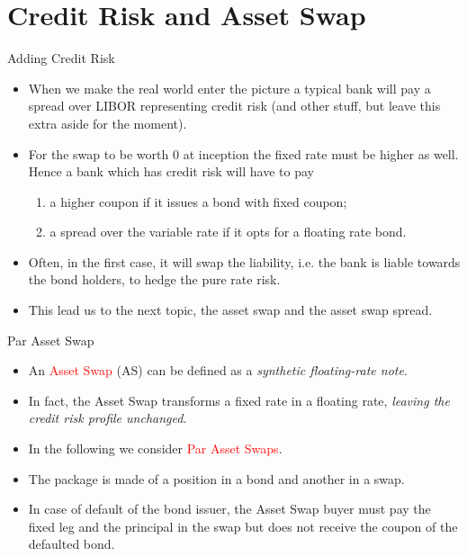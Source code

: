 \documentclass{beamer}
\begin{document}
\section{Credit Risk and Asset Swap}
\begin{frame}{Adding Credit Risk}
	\begin{itemize}
		\item When we make the real world enter the picture a typical bank will pay a spread over LIBOR representing credit risk (and other stuff, but leave this extra aside for the moment). 
		\item For the swap to be worth 0 at inception the fixed rate must be higher as well. Hence a bank which has credit risk will have to pay
		\begin{enumerate}
			\item a higher coupon if it issues a bond with fixed coupon;
			\item a spread over the variable rate if it opts for a floating rate bond.
		\end{enumerate}
		\item Often, in the first case, it will swap the liability, i.e. the bank is liable towards the bond holders, to hedge the pure rate risk. 
		\item This lead us to the next topic, the asset swap and the asset swap spread.
	\end{itemize}
\end{frame}

\begin{frame}{Par Asset Swap}
	\begin{itemize}
		\item An \textcolor{red}{Asset Swap} (AS) can be defined as a \emph{synthetic floating-rate note}.
		\item In fact, the Asset Swap transforms a fixed rate in a floating rate, \emph{leaving the credit risk profile unchanged}.
		\item In the following we consider \textcolor{red}{Par Asset Swaps}. 
		\item The package is made of a position in a bond and another in a swap.
		\item In case of default of the bond issuer, the Asset Swap buyer must pay the fixed leg and the principal in the swap but does not receive the coupon of the defaulted bond. 
	\end{itemize}
\end{frame}
\end{document}
